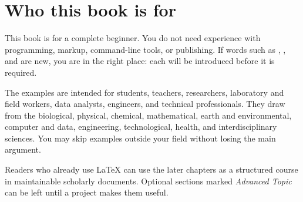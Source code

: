 \chapter*{Who this book is for}

This book is for a complete beginner. You do not need experience with
programming, markup, command-line tools, or publishing. If words such as
, , and  are new, you are in the
right place: each will be introduced before it is required.

The examples are intended for students, teachers, researchers, laboratory and
field workers, data analysts, engineers, and technical professionals. They
draw from the biological, physical, chemical, mathematical, earth and
environmental, computer and data, engineering, technological, health, and
interdisciplinary sciences. You may skip examples outside your field without
losing the main argument.

Readers who already use \LaTeX{} can use the later chapters as a structured
course in maintainable scholarly documents. Optional sections marked
\emph{Advanced Topic} can be left until a project makes them useful.

